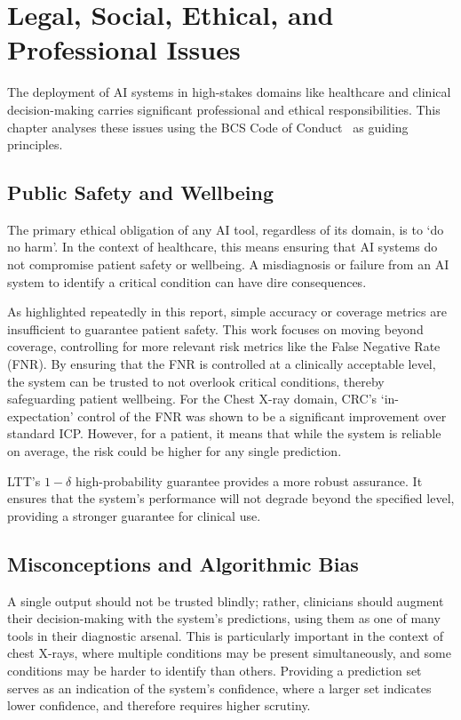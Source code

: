 \chapter{Legal, Social, Ethical, and Professional Issues}
\label{ch:legal}

The deployment of AI systems in high-stakes domains
like healthcare and clinical decision-making
carries significant professional and ethical responsibilities.
This chapter analyses these issues using the BCS
Code of Conduct~\cite{bcs-code-of-conduct} as guiding principles.

\section{Public Safety and Wellbeing}

The primary ethical obligation of any AI tool, regardless of its domain, is to `do no harm'.
In the context of healthcare, this means ensuring that AI systems
do not compromise patient safety or wellbeing.
A misdiagnosis or failure from an AI system
to identify a critical condition can have dire consequences.

As highlighted repeatedly in this report,
simple accuracy or coverage metrics are insufficient
to guarantee patient safety.
This work focuses on moving beyond coverage, controlling for more
relevant risk metrics like the False Negative Rate (FNR).
By ensuring that the FNR is controlled at a clinically acceptable level,
the system can be trusted to not overlook critical conditions,
thereby safeguarding patient wellbeing.
For the Chest X-ray domain, CRC's `in-expectation' control of the FNR
was shown to be a significant improvement over standard ICP.
However, for a patient, it means that while the system is reliable on average,
the risk could be higher for any single prediction.

LTT's \(1 - \delta\) high-probability guarantee
provides a more robust assurance.
It ensures that the system's performance will not degrade beyond the specified level,
providing a stronger guarantee for clinical use.

\section{Misconceptions and Algorithmic Bias}

A single output should not be trusted blindly;
rather, clinicians should augment their decision-making
with the system's predictions,
using them as one of many tools in their diagnostic arsenal.
This is particularly important in the context of chest X-rays,
where multiple conditions may be present simultaneously,
and some conditions may be harder to identify than others.
Providing a prediction set serves as an indication of the system's confidence,
where a larger set indicates lower confidence, and therefore requires higher scrutiny.

